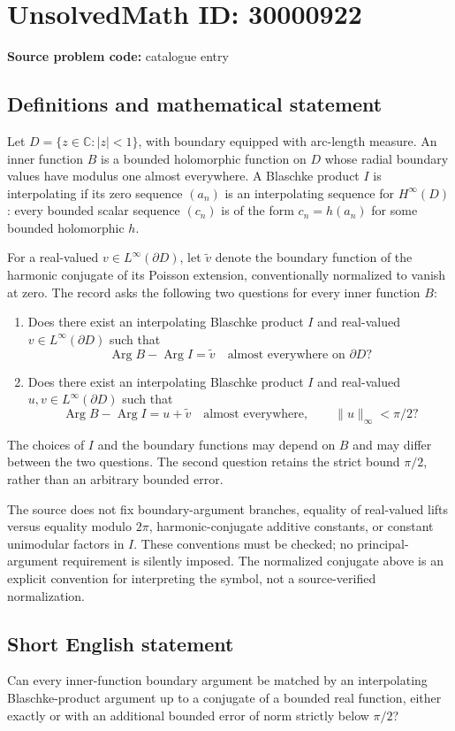 \documentclass[11pt]{article}
\newcommand{\C}{\mathbb{C}}
\begin{document}
\section*{UnsolvedMath ID: 30000922}
\textbf{Source problem code:} catalogue entry
\subsection{Definitions and mathematical statement}
Let \(D=\{z\in\C:|z|<1\}\), with boundary equipped with arc-length measure. An inner function \(B\) is a bounded holomorphic function on \(D\) whose radial boundary values have modulus one almost everywhere. A Blaschke product \(I\) is interpolating if its zero sequence \((a_n)\) is an interpolating sequence for \(H^\infty(D)\): every bounded scalar sequence \((c_n)\) is of the form \(c_n=h(a_n)\) for some bounded holomorphic \(h\).

For a real-valued \(v\in L^\infty(\partial D)\), let \(\widetilde v\) denote the boundary function of the harmonic conjugate of its Poisson extension, conventionally normalized to vanish at zero. The record asks the following two questions for every inner function \(B\):
\begin{enumerate}
\item Does there exist an interpolating Blaschke product \(I\) and real-valued \(v\in L^\infty(\partial D)\) such that
\[
\operatorname{Arg}B-\operatorname{Arg}I=\widetilde v\quad\text{almost everywhere on }\partial D?
\]
\item Does there exist an interpolating Blaschke product \(I\) and real-valued \(u,v\in L^\infty(\partial D)\) such that
\[
\operatorname{Arg}B-\operatorname{Arg}I=u+\widetilde v\quad\text{almost everywhere},
\qquad \|u\|_\infty<\pi/2?
\]
\end{enumerate}
The choices of \(I\) and the boundary functions may depend on \(B\) and may differ between the two questions. The second question retains the strict bound \(\pi/2\), rather than an arbitrary bounded error.

The source does not fix boundary-argument branches, equality of real-valued lifts versus equality modulo \(2\pi\), harmonic-conjugate additive constants, or constant unimodular factors in \(I\). These conventions must be checked; no principal-argument requirement is silently imposed. The normalized conjugate above is an explicit convention for interpreting the symbol, not a source-verified normalization.
\subsection{Short English statement}
Can every inner-function boundary argument be matched by an interpolating Blaschke-product argument up to a conjugate of a bounded real function, either exactly or with an additional bounded error of norm strictly below \(\pi/2\)?
\end{document}
